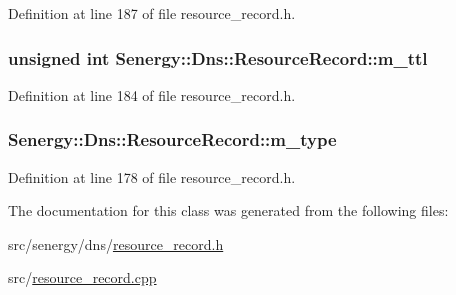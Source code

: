 Definition at line 187 of file resource\-\_\-record.\-h.

\hypertarget{class_senergy_1_1_dns_1_1_resource_record_ac30e456e4945e8bb9abd3d55fa168ff5}{
\subsubsection[{m\-\_\-ttl}]{\setlength{\rightskip}{0pt plus 5cm}unsigned int Senergy\-::\-Dns\-::\-Resource\-Record\-::m\-\_\-ttl\hspace{0.3cm}{\ttfamily [protected]}}}\label{class_senergy_1_1_dns_1_1_resource_record_ac30e456e4945e8bb9abd3d55fa168ff5}


Definition at line 184 of file resource\-\_\-record.\-h.

\hypertarget{class_senergy_1_1_dns_1_1_resource_record_a443ff133b10a314058bc6174558415a8}{
\subsubsection[{m\-\_\-type}]{ Senergy\-::\-Dns\-::\-Resource\-Record\-::m\-\_\-type\hspace{0.3cm}{\ttfamily [protected]}}}\label{class_senergy_1_1_dns_1_1_resource_record_a443ff133b10a314058bc6174558415a8}


Definition at line 178 of file resource\-\_\-record.\-h.



The documentation for this class was generated from the following files\-:\begin{DoxyCompactItemize}
\item 
src/senergy/dns/\hyperlink{resource__record_8h}{resource\-\_\-record.\-h}\item 
src/\hyperlink{resource__record_8cpp}{resource\-\_\-record.\-cpp}\end{DoxyCompactItemize}

